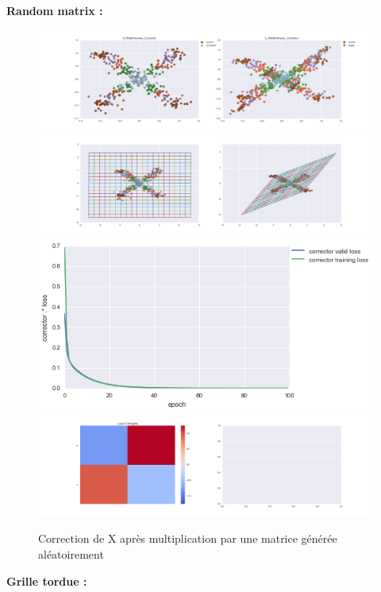 {\Large \textbf{Random matrix :}}

\begin{figure}[H] %
\centering
\includegraphics[width=\linewidth]{fig/24-05-2016/X/X_RMatPairwise_Corrector-DATA.png}
\includegraphics[width=\linewidth]{fig/24-05-2016/X/X_RMatPairwise_Corrector-GridCheck.png}
\includegraphics[width=0.45\linewidth]{fig/24-05-2016/X/X_RMatPairwise_Corrector-Learning_curve.png}
\includegraphics[width=\linewidth]{fig/24-05-2016/X/X_RMatPairwise_Corrector-W.png}
\caption{Correction de X après multiplication par une matrice générée aléatoirement}
\label{fig:recap-X-RMat-pairwise}
\end{figure}


{\Large \textbf{Grille tordue :}}

